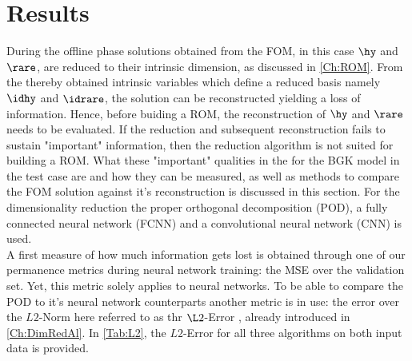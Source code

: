 
\chapter{Results}
\label{Results}

During the offline phase solutions obtained from the FOM, in this case $\hy$ and $\rare$, are reduced to their intrinsic dimension, as discussed in \cref{Ch:ROM}. From the thereby obtained intrinsic variables which define a reduced basis namely $\idhy$ and $\idrare$, the solution can be reconstructed yielding a loss of information. Hence, before buiding a ROM, the reconstruction of $\hy$ and $\rare$ needs to be evaluated. If the reduction and subsequent reconstruction fails to sustain "important" information, then the reduction algorithm is not suited for building a ROM. What these "important" qualities in the for the BGK model in the test case are and how they can be measured, as well as methods to compare the FOM solution against it's reconstruction is discussed in this section. For the dimensionality reduction the proper orthogonal decomposition (POD), a fully connected neural network (FCNN) and a convolutional neural network (CNN) is used.\\

A first measure of how much information gets lost is obtained through one of our permanence metrics during neural network training: the MSE over the validation set. Yet, this metric solely applies to neural networks. To be able to compare the POD to it's neural network counterparts another metric is in use: the error over the $L2$-Norm here referred to as thr $\L2$-Error , already introduced in \cref{Ch:DimRedAl}. In \cref{Tab:L2}, the $L2$-Error for all three algorithms on both input data is provided.

